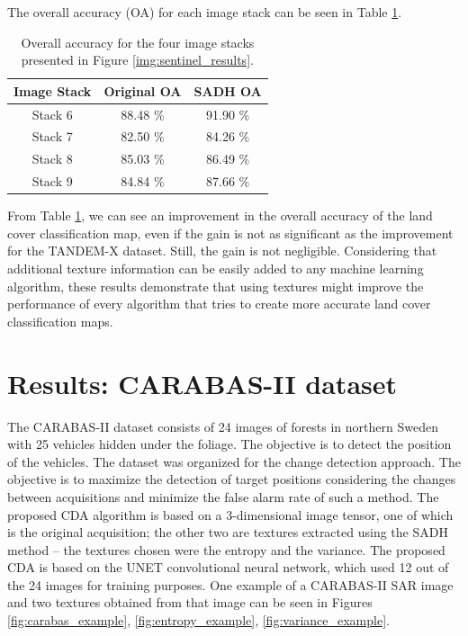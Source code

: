 The overall accuracy (OA) for each image stack can be seen in Table \ref{tab:sentinel_table_results}.

\begin{table}[H]
    \centering
    \begin{tabular}{ |c |c | c|}
     \hline
        Image Stack & Original OA & SADH OA\\ \hline \hline
        Stack 6 & 88.48 \% & 91.90 \% \\ \hline
        Stack 7 & 82.50 \% & 84.26 \% \\ \hline
        Stack 8 & 85.03 \% & 86.49 \% \\ \hline
        Stack 9 & 84.84 \% & 87.66 \% \\  \hline
    \end{tabular}
    \caption{Overall accuracy for the four image stacks presented in Figure \ref{img:sentinel_results}.}
    \label{tab:sentinel_table_results}
\end{table}

From Table \ref{tab:sentinel_table_results}, we can see an improvement in the overall accuracy of the land cover classification map, even if the gain is not as significant as the improvement for the TANDEM-X dataset. Still, the gain is not negligible. Considering that additional texture information can be easily added to any machine learning algorithm, these results demonstrate that using textures might improve the performance of every algorithm that tries to create more accurate land cover classification maps.

\section{Results: CARABAS-II dataset}

The CARABAS-II dataset consists of 24 images of forests in northern Sweden with 25 vehicles hidden under the foliage. The objective is to detect the position of the vehicles. The dataset was organized for the change detection approach. The objective is to maximize the detection of target positions considering the changes between acquisitions and minimize the false alarm rate of such a method.
The proposed CDA algorithm is based on a 3-dimensional image tensor, one of which is the original acquisition; the other two are textures extracted using the SADH method -- the textures chosen were the entropy and the variance. The proposed CDA is based on the UNET convolutional neural network, which used 12 out of the 24 images for training purposes. One example of a CARABAS-II SAR image and two textures obtained from that image can be seen in Figures \ref{fig:carabas_example}, \ref{fig:entropy_example}, \ref{fig:variance_example}.

